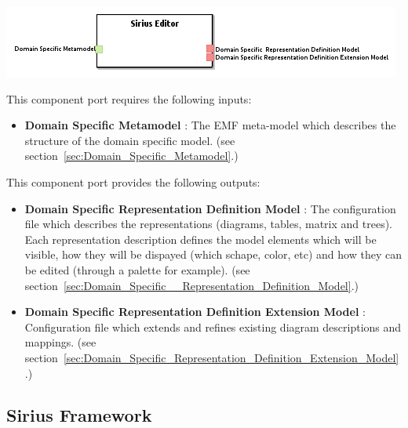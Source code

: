 \documentclass{gemoc} %
\begin{document}
\begin{center}
\includegraphics*[trim=0.0cm 0.0cm 0cm 0.0cm, clip=true]{../images/generated/Generated_Sirius_Editor.png}
\end{center}

This component port requires the following inputs:
\begin{itemize}
  \item \textbf{Domain Specific Metamodel} :
The EMF meta-model which describes the structure of the domain specific model.
(see section~\ref{sec:Domain_Specific_Metamodel}.)
\end{itemize}

This component port provides the following outputs:
\begin{itemize}
  \item \textbf{Domain Specific  Representation Definition Model} :
The configuration file which describes the representations (diagrams, tables, matrix and trees). Each representation description defines the model elements which will be visible, how they will be dispayed (which schape, color, etc) and how they can be edited (through a palette for example).
(see section~\ref{sec:Domain_Specific__Representation_Definition_Model}.)
  \item \textbf{Domain Specific Representation Definition Extension Model} :
Configuration file which extends and refines existing diagram descriptions and mappings.
(see section~\ref{sec:Domain_Specific_Representation_Definition_Extension_Model}.)
\end{itemize}


\subsection{Sirius Framework}
\label{sec:Sirius_Framework}
\end{document}
